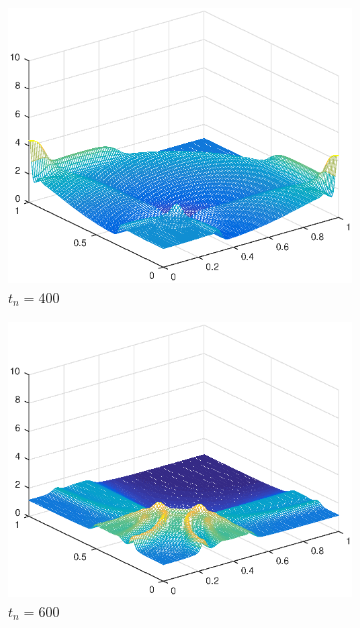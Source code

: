 \begin{figure}[h!]
\begin{subfigure}[t]{0.48\textwidth}
        \centering
        \includegraphics[width=\textwidth]{images/sol_ri_0400.eps}
        \caption{$t_{n}=400$}
        \label{fig:100}
    \end{subfigure}
    \begin{subfigure}[t]{0.48\textwidth}
        \centering
        \includegraphics[width=\textwidth]{images/sol_ri_0600.eps}
        \caption{$t_{n}=600$}
        \label{fig:100}
    \end{subfigure}
    \begin{subfigure}[t]{0.48\textwidth}
        \centering

\end{subfigure}
\end{figure}
